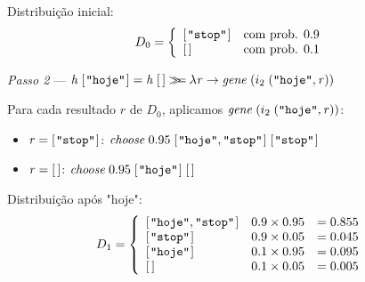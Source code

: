 \documentclass[11pt, a4paper, fleqn]{article}
\newcommand{\Varid}[1]{\mathit{#1}}
\newcommand{\bind}{\mathbin{>\!\!\!>\mkern-6.7mu=}}
\begin{document}
Distribuição inicial:
\begin{displaymath}
D_0 = \left\{ \begin{array}{ll} \text{\ensuremath{[\mskip1.5mu \text{\ttfamily \char34 stop\char34}\mskip1.5mu]}} & \text{com prob. } 0.9 \\ \text{\ensuremath{[\mskip1.5mu \mskip1.5mu]}}  & \text{com prob. } 0.1 \end{array} \right.
\end{displaymath}

\emph{Passo 2} — \ensuremath{\Varid{h}\;[\mskip1.5mu \text{\ttfamily \char34 hoje\char34}\mskip1.5mu]\mathrel{=}\Varid{h}\;[\mskip1.5mu \mskip1.5mu]\bind \lambda \Varid{r}\to \Varid{gene}\;(i_2\;(\text{\ttfamily \char34 hoje\char34},\Varid{r}))}

Para cada resultado \ensuremath{\Varid{r}} de $D_0$, aplicamos \ensuremath{\Varid{gene}\;(i_2\;(\text{\ttfamily \char34 hoje\char34},\Varid{r}))}:
\begin{itemize}
    \item \ensuremath{\Varid{r}\mathrel{=}[\mskip1.5mu \text{\ttfamily \char34 stop\char34}\mskip1.5mu]}: \ensuremath{\Varid{choose}\;\mathrm{0.95}\;[\mskip1.5mu \text{\ttfamily \char34 hoje\char34},\text{\ttfamily \char34 stop\char34}\mskip1.5mu]\;[\mskip1.5mu \text{\ttfamily \char34 stop\char34}\mskip1.5mu]}
    \item \ensuremath{\Varid{r}\mathrel{=}[\mskip1.5mu \mskip1.5mu]}: \ensuremath{\Varid{choose}\;\mathrm{0.95}\;[\mskip1.5mu \text{\ttfamily \char34 hoje\char34}\mskip1.5mu]\;[\mskip1.5mu \mskip1.5mu]}
\end{itemize}

Distribuição após "hoje":
\begin{displaymath}
D_1 = \left\{ \begin{array}{lll}
\text{\ensuremath{[\mskip1.5mu \text{\ttfamily \char34 hoje\char34},\text{\ttfamily \char34 stop\char34}\mskip1.5mu]}} & 0.9 \times 0.95 &= 0.855 \\
\text{\ensuremath{[\mskip1.5mu \text{\ttfamily \char34 stop\char34}\mskip1.5mu]}}        & 0.9 \times 0.05 &= 0.045 \\
\text{\ensuremath{[\mskip1.5mu \text{\ttfamily \char34 hoje\char34}\mskip1.5mu]}}        & 0.1 \times 0.95 &= 0.095 \\
\text{\ensuremath{[\mskip1.5mu \mskip1.5mu]}}              & 0.1 \times 0.05 &= 0.005
\end{array} \right.
\end{displaymath}
\end{document}
